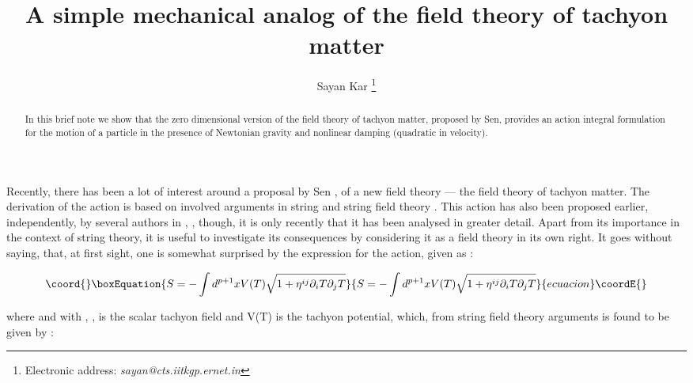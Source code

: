 \documentclass[a4paper,prd,aps,twocolumn]{revtex4}
\begin{document}
\title{A simple mechanical analog of the field theory of tachyon matter}
\author{Sayan Kar \footnote{Electronic address: {\em sayan@cts.iitkgp.ernet.in}}
\myHighlight{${}^{}$}\coordHE{}
}
\address{Department of Physics and Centre for
Theoretical Studies \\Indian Institute of Technology, Kharagpur 721 302, India}
\begin{abstract}
In this brief note we show that the zero dimensional version of the field 
theory of tachyon matter, proposed by Sen, 
provides an action integral formulation for the 
motion of a particle in the presence of Newtonian gravity 
and nonlinear damping (quadratic in velocity).   
\end{abstract}
\maketitle


\maketitle
\vspace{.2in}

Recently, there has been a lot of interest around a proposal
by Sen {\cite{sen1}}, of a new field theory  
--- the field theory of tachyon matter. The derivation of the
action is based on involved arguments in string and
string field theory {\cite{sen1,sen2}}. This action has also been
proposed earlier, independently, by several authors in
{\cite{others}}, {\cite{panda}}, though, it is only recently 
that it has been analysed in greater detail{\cite{sen1,sen2}}.
Apart from its importance in the context of string theory,
it is useful to
investigate its consequences by considering it 
as a field theory in its own right. 
It goes without saying, that, at first sight, one
is somewhat surprised by the expression for the action, given as :

\begin{equation}\coord{}\boxEquation{
S = -\int d^{p+1}x V(T)\sqrt{1+\eta^{ij}\partial_i T\partial_j T}
}{
S = -\int d^{p+1}x V(T)\sqrt{1+\eta^{ij}\partial_i T\partial_j T}
}{ecuacion}\coordE{}\end{equation}

\noindent where \coordHE{} and \myHighlight{$\eta_{\alpha\beta} = \delta_{\alpha\beta}$}\coordHE{}
with \myHighlight{$\alpha$}\coordHE{}, \coordHE{},
\coordHE{} is the scalar tachyon field and  V(T) is the tachyon potential,
which, from string field theory arguments is found to be given by : 
\end{document}
